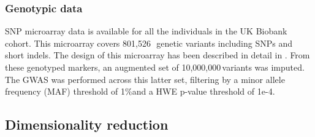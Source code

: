 \documentclass[twocolumn]{llncs}
\newcommand{\NCALLS}{801,526\,} %
\newcommand{\MAFTHR}{1\%} %
\newcommand{\NIMP}{10,000,000\,} %
\newcommand{\HWEPVAL}{1e-4} %
\begin{document}




\subsubsection{Genotypic data}
SNP microarray data is available for all the individuals in the UK Biobank cohort. This microarray covers \NCALLS\, genetic variants including SNPs and short indels. The design of this microarray has been described in detail in %
. From these genotyped markers, an augmented set of \NIMP variants was imputed. The GWAS was performed across this latter set, filtering by a minor allele frequency (MAF) threshold of \MAFTHR and a HWE p-value threshold of \HWEPVAL.


\subsection{Dimensionality reduction}
\label{results:dimensionality_reduction}
\end{document}
